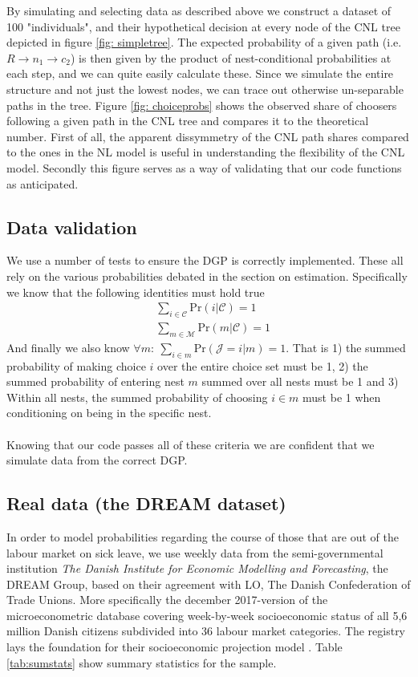 By simulating and selecting data as described above we construct a dataset of 100 "individuals", and their hypothetical decision at every node of the CNL tree depicted in figure \ref{fig: simpletree}. The expected probability of a given path (i.e. $R\rightarrow n_1 \rightarrow c_2$) is then given by the product of nest-conditional probabilities at each step, and we can quite easily calculate these. Since we simulate the entire structure and not just the lowest nodes, we can trace out otherwise un-separable paths in the tree. Figure \ref{fig: choiceprobs} shows the observed share of choosers following a given path in the CNL tree and compares it to the theoretical number. First of all, the apparent dissymmetry of the CNL path shares compared to the ones in the NL model is useful in understanding the flexibility of the CNL model. Secondly this figure serves as a way of validating that our code functions as anticipated.


\subsection{Data validation}
We use a number of tests to ensure the DGP is correctly implemented. These all rely on the various probabilities debated in the section on estimation. Specifically we know that the following identities must hold true
\begin{equation}
  \begin{split}
  &\sum_{i\in \mathcal{C}} \textrm{Pr}(i|\mathcal{C}) = 1 \\
  &\sum_{m\in \mathcal{M}} \textrm{Pr}(m|\mathcal{C}) = 1
  \end{split}
\end{equation}
And finally we also know $\forall m : \ \sum_{i \in m} \textrm{Pr}(\mathcal{J} = i | m) = 1$. That is 1) the summed probability of making choice $i$ over the entire choice set must be 1, 2) the summed probability of entering nest $m$ summed over all nests must be 1 and 3) Within all nests, the summed probability of choosing $i\in m$ must be 1 when conditioning on being in the specific nest.
\\ \\
Knowing that our code passes all of these criteria we are confident that we simulate data from the correct DGP.

\subsection{Real data (the DREAM dataset)} \label{subsec: dreamdata}
In order to model probabilities regarding the course of those that are out of the labour market on sick leave, we use weekly data from the semi-governmental institution \textit{The Danish Institute for Economic Modelling and Forecasting}, the DREAM Group, based on their agreement with LO, The Danish Confederation of Trade Unions. More specifically the december 2017-version of the microeconometric database covering week-by-week socioeconomic status of all 5,6 million Danish citizens subdivided into 36 labour market categories. The registry lays the foundation for their socioeconomic projection model \citep{dream_danish_2018}. Table \ref{tab:sumstats} show summary statistics for the sample.

